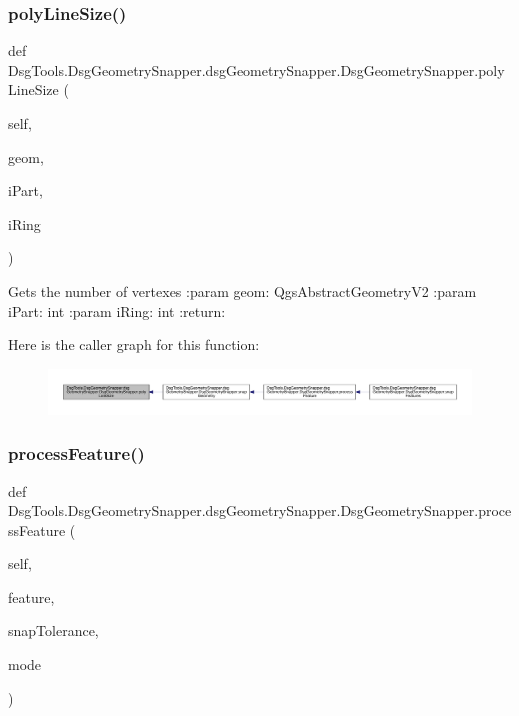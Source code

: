 \subsubsection{\texorpdfstring{poly\+Line\+Size()}{polyLineSize()}}
{\footnotesize\ttfamily def Dsg\+Tools.\+Dsg\+Geometry\+Snapper.\+dsg\+Geometry\+Snapper.\+Dsg\+Geometry\+Snapper.\+poly\+Line\+Size (\begin{DoxyParamCaption}\item[{}]{self,  }\item[{}]{geom,  }\item[{}]{i\+Part,  }\item[{}]{i\+Ring }\end{DoxyParamCaption})}

\begin{DoxyVerb}Gets the number of vertexes
:param geom: QgsAbstractGeometryV2
:param iPart: int
:param iRing: int
:return:
\end{DoxyVerb}
 Here is the caller graph for this function\+:
\nopagebreak
\begin{figure}[H]
\begin{center}
\leavevmode
\includegraphics[width=350pt]{class_dsg_tools_1_1_dsg_geometry_snapper_1_1dsg_geometry_snapper_1_1_dsg_geometry_snapper_a7e424d4f1b7a44c442de0293124105f8_icgraph}
\end{center}
\end{figure}
\mbox{\label{class_dsg_tools_1_1_dsg_geometry_snapper_1_1dsg_geometry_snapper_1_1_dsg_geometry_snapper_a454e82613c178a7bf1322353d49c50cb}} 
\subsubsection{\texorpdfstring{process\+Feature()}{processFeature()}}
{\footnotesize\ttfamily def Dsg\+Tools.\+Dsg\+Geometry\+Snapper.\+dsg\+Geometry\+Snapper.\+Dsg\+Geometry\+Snapper.\+process\+Feature (\begin{DoxyParamCaption}\item[{}]{self,  }\item[{}]{feature,  }\item[{}]{snap\+Tolerance,  }\item[{}]{mode }\end{DoxyParamCaption})}

